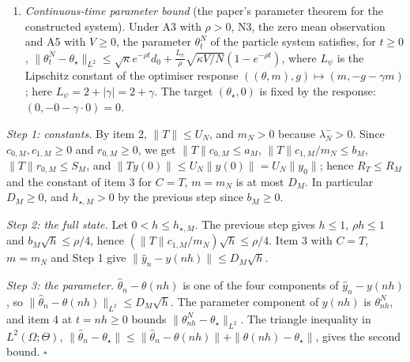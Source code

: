 \documentclass[11pt,a4paper]{report}
\begin{document}
\begin{enumerate}


\item \emph{Continuous-time parameter bound} (the paper's parameter theorem for the constructed system). Under A3 with \(\rho>0\), N3, the zero mean observation and A5 with \(V\ge0\), the parameter \(\theta^N_t\) of the particle system satisfies, for \(t\ge0\), \(\|\theta^N_t-\theta_\star\|_{L^2}\le\sqrt\kappa e^{-\rho t}d_0+\frac{L_\psi}{\rho}\sqrt{\kappa V/N}(1-e^{-\rho t})\), where \(L_\psi\) is the Lipschitz constant of the optimiser response \(((\theta,m),g)\mapsto(m,-g-\gamma m)\); here \(L_\psi=2+|\gamma|=2+\gamma\). The target \((\theta_\star,0)\) is fixed by the response: \((0,-0-\gamma\cdot0)=0\).

\end{enumerate}



\emph{Step 1: constants.} By item 2, \(\|T\|\le U_N\), and \(m_N>0\) because \(\lambda_N^->0\). Since \(c_{0,M},c_{1,M}\ge0\) and \(r_{0,M}\ge0\), we get \(\|T\|c_{0,M}\le a_M\), \(\|T\|c_{1,M}/m_N\le b_M\), \(\|T\|r_{0,M}\le S_M\), and \(\|Ty(0)\|\le U_N\|y(0)\|=U_N\|y_0\|\); hence \(R_T\le R_M\) and the constant of item 3 for \(C=T\), \(m=m_N\) is at most \(D_M\). In particular \(D_M\ge0\), and \(h_{\star,M}>0\) by the previous step since \(b_M\ge0\).




\emph{Step 2: the full state.} Let \(0<h\le h_{\star,M}\). The previous step gives \(h\le1\), \(\rho h\le1\) and \(b_M\sqrt h\le\rho/4\), hence \((\|T\|c_{1,M}/m_N)\sqrt h\le\rho/4\). Item 3 with \(C=T\), \(m=m_N\) and Step 1 give \(\|\hat y_n-y(nh)\|\le D_M\sqrt h\).




\emph{Step 3: the parameter.} \(\hat\theta_n-\theta(nh)\) is one of the four components of \(\hat y_n-y(nh)\), so \(\|\hat\theta_n-\theta(nh)\|_{L^2}\le D_M\sqrt h\). The parameter component of \(y(nh)\) is \(\theta^N_{nh}\), and item 4 at \(t=nh\ge0\) bounds \(\|\theta^N_{nh}-\theta_\star\|_{L^2}\). The triangle inequality in \(L^2(\Omega;\Theta)\), \(\|\hat\theta_n-\theta_\star\|\le\|\hat\theta_n-\theta(nh)\|+\|\theta(nh)-\theta_\star\|\), gives the second bound. \(\square\)
\end{document}
